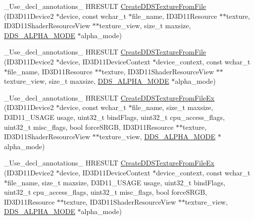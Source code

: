 \begin{DoxyCompactItemize}
\item 
\+\_\+\+Use\+\_\+decl\+\_\+annotations\+\_\+ H\+R\+E\+S\+U\+LT \hyperlink{namespacemage_a3a3965b1c7679947007304baf7ba0cde}{Create\+D\+D\+S\+Texture\+From\+File} (I\+D3\+D11\+Device2 $\ast$device, const wchar\+\_\+t $\ast$file\+\_\+name, I\+D3\+D11\+Resource $\ast$$\ast$texture, I\+D3\+D11\+Shader\+Resource\+View $\ast$$\ast$texture\+\_\+view, size\+\_\+t maxsize, \hyperlink{namespacemage_a0c586a2bad862f4858900ca121ca80c2}{D\+D\+S\+\_\+\+A\+L\+P\+H\+A\+\_\+\+M\+O\+DE} $\ast$alpha\+\_\+mode)
\item 
\+\_\+\+Use\+\_\+decl\+\_\+annotations\+\_\+ H\+R\+E\+S\+U\+LT \hyperlink{namespacemage_a6385bd66f00f588eb7735234edd95f1e}{Create\+D\+D\+S\+Texture\+From\+File} (I\+D3\+D11\+Device2 $\ast$device, I\+D3\+D11\+Device\+Context $\ast$device\+\_\+context, const wchar\+\_\+t $\ast$file\+\_\+name, I\+D3\+D11\+Resource $\ast$$\ast$texture, I\+D3\+D11\+Shader\+Resource\+View $\ast$$\ast$texture\+\_\+view, size\+\_\+t maxsize, \hyperlink{namespacemage_a0c586a2bad862f4858900ca121ca80c2}{D\+D\+S\+\_\+\+A\+L\+P\+H\+A\+\_\+\+M\+O\+DE} $\ast$alpha\+\_\+mode)
\item 
\+\_\+\+Use\+\_\+decl\+\_\+annotations\+\_\+ H\+R\+E\+S\+U\+LT \hyperlink{namespacemage_aca15cd1804aa3b23b806a44c31019db8}{Create\+D\+D\+S\+Texture\+From\+File\+Ex} (I\+D3\+D11\+Device2 $\ast$device, const wchar\+\_\+t $\ast$file\+\_\+name, size\+\_\+t maxsize, D3\+D11\+\_\+\+U\+S\+A\+GE usage, uint32\+\_\+t bind\+Flags, uint32\+\_\+t cpu\+\_\+access\+\_\+flags, uint32\+\_\+t misc\+\_\+flags, bool force\+S\+R\+GB, I\+D3\+D11\+Resource $\ast$$\ast$texture, I\+D3\+D11\+Shader\+Resource\+View $\ast$$\ast$texture\+\_\+view, \hyperlink{namespacemage_a0c586a2bad862f4858900ca121ca80c2}{D\+D\+S\+\_\+\+A\+L\+P\+H\+A\+\_\+\+M\+O\+DE} $\ast$alpha\+\_\+mode)
\item 
\+\_\+\+Use\+\_\+decl\+\_\+annotations\+\_\+ H\+R\+E\+S\+U\+LT \hyperlink{namespacemage_a098c27d7fa0aa4437d4a878c7eb75792}{Create\+D\+D\+S\+Texture\+From\+File\+Ex} (I\+D3\+D11\+Device2 $\ast$device, I\+D3\+D11\+Device\+Context $\ast$device\+\_\+context, const wchar\+\_\+t $\ast$file\+\_\+name, size\+\_\+t maxsize, D3\+D11\+\_\+\+U\+S\+A\+GE usage, uint32\+\_\+t bind\+Flags, uint32\+\_\+t cpu\+\_\+access\+\_\+flags, uint32\+\_\+t misc\+\_\+flags, bool force\+S\+R\+GB, I\+D3\+D11\+Resource $\ast$$\ast$texture, I\+D3\+D11\+Shader\+Resource\+View $\ast$$\ast$texture\+\_\+view, \hyperlink{namespacemage_a0c586a2bad862f4858900ca121ca80c2}{D\+D\+S\+\_\+\+A\+L\+P\+H\+A\+\_\+\+M\+O\+DE} $\ast$alpha\+\_\+mode)
\item 

\end{DoxyCompactItemize}
